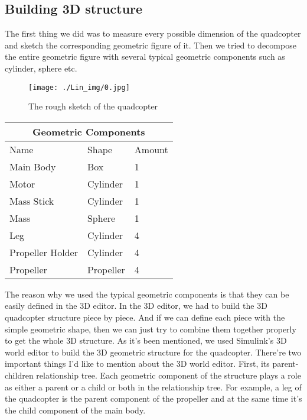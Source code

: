 \subsection{Building 3D structure}
The first thing we did was to measure every possible dimension of the quadcopter and sketch the corresponding geometric figure of it. Then we tried to decompose the entire geometric figure with several typical geometric components such as cylinder, sphere etc.
\begin{figure}[h]
\centering
\texttt{[image: ./Lin\_img/0.jpg]}
\caption{The rough sketch of the quadcopter}
\end{figure}
\begin{center}
\begin{tabular}{ |p{3cm}|p{3cm}|p{3cm}|  }
 \hline
 \multicolumn{3}{|c|}{Geometric Components} \\
 \hline
 Name   & Shape   &Amount \\
 \hline
 Main Body & Box & 1  \\
 Motor & Cylinder & 1  \\
 Mass Stick    & Cylinder & 1 \\
 Mass &  Sphere & 1 \\
 Leg & Cylinder & 4  \\
 Propeller Holder & Cylinder & 4  \\
 Propeller & Propeller & 4  \\
 \hline
\end{tabular}
\end{center}
The reason why we used the typical geometric components is that they can be easily defined in the 3D editor. In the 3D editor, we had to build the 3D quadcopter structure piece by piece. And if we can define each piece with the simple geometric shape, then we can just try to combine them together properly to get the whole 3D structure.
\newline
\newline
As it’s been mentioned, we used Simulink’s 3D world editor to build the 3D geometric structure for the quadcopter. There’re two important things I’d like to mention about the 3D world editor. 
\newline
\newline
First, its parent-children relationship tree. Each geometric component of the structure plays a role as either a parent or a child or both in the relationship tree. For example, a leg of the quadcopter is the parent component of the propeller and at the same time it’s the child component of the main body.
